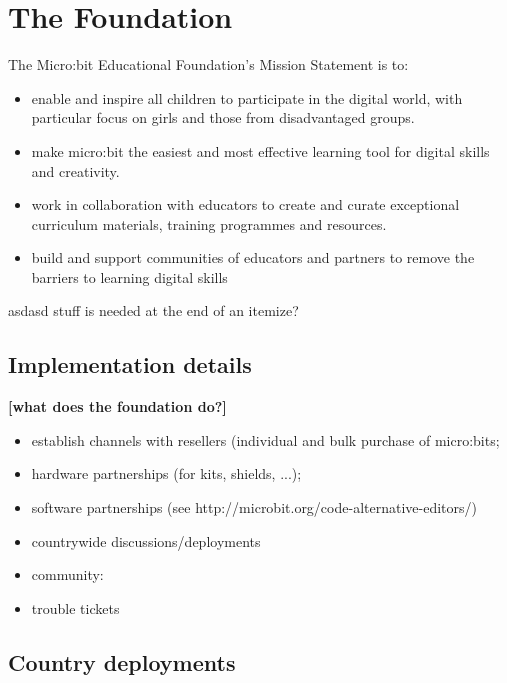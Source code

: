 \section{The Foundation}
\label{sec:mef}

The Micro:bit Educational Foundation's Mission Statement is to:
\begin{itemize}
\item  enable and inspire all children to participate in the digital world,
with particular focus on girls and those from disadvantaged groups.
\item make micro:bit the easiest and most effective learning tool for digital skills and creativity.
\item work in collaboration with educators to create and curate exceptional
curriculum materials, training programmes and resources.
\item build and support communities of educators and partners
to remove the barriers to learning digital skills
\end{itemize}

asdasd stuff is needed at the end of an itemize?

%


\subsection{Implementation details}

{\bf [what does the foundation do?]}
\begin{itemize}
    \item establish channels with resellers (individual and bulk purchase of micro:bits;
    \item hardware partnerships (for kits, shields, ...);
    \item software partnerships (see http://microbit.org/code-alternative-editors/)
    \item countrywide discussions/deployments
    \item community: 
    \item trouble tickets
\end{itemize}

\subsection{Country deployments}

